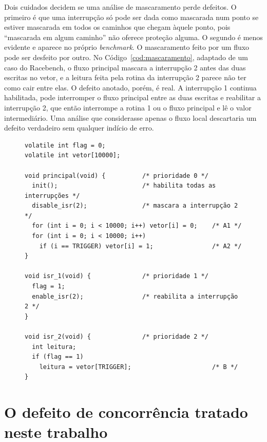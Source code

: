 Dois cuidados decidem se uma análise de mascaramento perde defeitos. O primeiro
é que uma interrupção só pode ser dada como mascarada num ponto se estiver
mascarada em todos os caminhos que chegam àquele ponto, pois ``mascarada em
algum caminho'' não oferece proteção alguma. O segundo é menos evidente e aparece no
próprio \textit{benchmark}. O mascaramento feito por um fluxo pode ser desfeito
por outro. No Código~\ref{cod:mascaramento}, adaptado de um caso do Racebench,
o fluxo principal mascara a interrupção 2 antes das duas escritas no vetor, e a
leitura feita pela rotina da interrupção 2 parece não ter como cair entre elas.
O defeito anotado, porém, é real. A interrupção 1 continua habilitada, pode
interromper o fluxo principal entre as duas escritas e reabilitar a
interrupção 2, que então interrompe a rotina 1 ou o fluxo principal e lê o
valor intermediário. Uma análise que considerasse apenas o fluxo local
descartaria um defeito verdadeiro sem qualquer indício de erro.

\begin{figure}[htb]
\begin{lstlisting}[caption={Mascaramento desfeito por outro fluxo}, label={cod:mascaramento}]
volatile int flag = 0;
volatile int vetor[10000];

void principal(void) {          /* prioridade 0 */
  init();                       /* habilita todas as interrupções */
  disable_isr(2);               /* mascara a interrupção 2 */
  for (int i = 0; i < 10000; i++) vetor[i] = 0;    /* A1 */
  for (int i = 0; i < 10000; i++)
    if (i == TRIGGER) vetor[i] = 1;                /* A2 */
}

void isr_1(void) {              /* prioridade 1 */
  flag = 1;
  enable_isr(2);                /* reabilita a interrupção 2 */
}

void isr_2(void) {              /* prioridade 2 */
  int leitura;
  if (flag == 1)
    leitura = vetor[TRIGGER];                      /* B */
}
\end{lstlisting}
\end{figure}

\section{O defeito de concorrência tratado neste trabalho}
\label{sec:defeitos}

